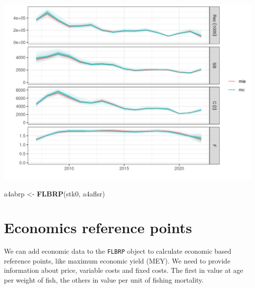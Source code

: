 \documentclass[
]{book}
\newenvironment{Shaded}{\begin{snugshade}}{\end{snugshade}}
\newcommand{\FunctionTok}[1]{\textcolor[rgb]{0.13,0.29,0.53}{\textbf{#1}}}
\newcommand{\NormalTok}[1]{#1}
\newcommand{\OtherTok}[1]{\textcolor[rgb]{0.56,0.35,0.01}{#1}}
\begin{document}
\includegraphics{_bookdown_files/_main_files/figure-html/unnamed-chunk-89-1.png}

\begin{Shaded}
\begin{Highlighting}[]
\NormalTok{a4abrp }\OtherTok{\textless{}{-}} \FunctionTok{FLBRP}\NormalTok{(stk0, a4aflsr)}
\end{Highlighting}
\end{Shaded}

\hypertarget{economics-reference-points}{%
\section{Economics reference points}\label{economics-reference-points}}

We can add economic data to the \texttt{FLBRP} object to calculate economic based reference points, like maximum economic yield (MEY). We need to provide information about price, variable costs and fixed costs. The first in value at age per weight of fish, the others in value per unit of fishing mortality.
\end{document}
